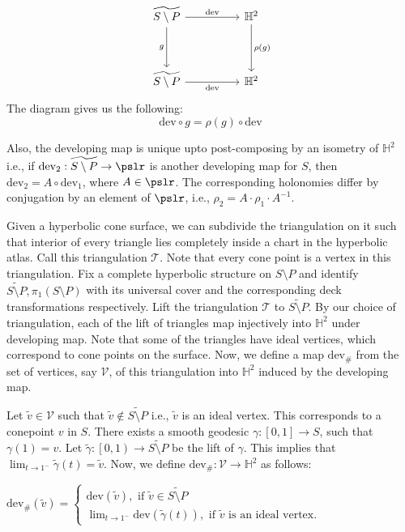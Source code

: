 \[\begin{tikzcd}
	{\widetilde{S \setminus P}} && {\mathbb{H}^2} \\
	\\
	{\widetilde{S \setminus P}} && {\mathbb{H}^2}
	\arrow["{\text{dev}}", from=1-1, to=1-3]
	\arrow["{\rho(g)}", from=1-3, to=3-3]
	\arrow["g"', from=1-1, to=3-1]
	\arrow["{\text{dev}}"', from=3-1, to=3-3]
\end{tikzcd}\]
The diagram gives us the following:
$$ \text{dev} \circ g = \rho(g) \circ \text{dev} $$

Also, the developing map is unique upto post-composing by an isometry of $\mathbb{H}^2$ i.e., if $\text{dev}_2: \widetilde{S\setminus P} \rightarrow \pslr$ is another developing map for $S$, then $\text{dev}_2 = A \circ \text{dev}_1$, where $A \in \pslr$. The corresponding holonomies differ by conjugation by an element of $\pslr$, i.e., $\rho_2 = A \cdot \rho_1 \cdot A^{-1}$. 

Given a hyperbolic cone surface, we can subdivide the triangulation on it such that interior of every triangle lies completely inside a chart in the hyperbolic atlas. Call this triangulation $\mathcal{T}$. Note that every cone point is a vertex in this triangulation. Fix a complete hyperbolic structure on $S \setminus P$ and identify $\widetilde{S \setminus P},  \pi_1(S \setminus P)$ with its universal cover and the corresponding deck transformations respectively. Lift the triangulation $\mathcal{T}$ to $\widetilde{S \setminus P}$. By our choice of triangulation, each of the lift of triangles map injectively into $\mathbb{H}^2$ under developing map. Note that some of the triangles have ideal vertices, which correspond to cone points on the surface. Now, we define a map $\text{dev}_{\#}$ from the set of vertices, say $\mathcal{V}$, of this triangulation into $\mathbb{H}^2$ induced by the developing map.

Let $\tilde{v} \in \mathcal{V}$ such that $\tilde{v} \notin \tilde{S \setminus P}$ i.e., $\tilde{v}$ is an ideal vertex. This corresponds to a conepoint $v$ in $S$. There exists a smooth geodesic $\gamma: [0,1] \rightarrow S$, such that $\gamma(1) = v$. Let $\widetilde{\gamma}: \left[0,1\right) \rightarrow \widetilde{S \setminus P}$ be the lift of $\gamma$. This implies that 
$\displaystyle \lim_{t \rightarrow 1^-} \tilde{\gamma}(t) = \tilde{v}$. Now, we define $\text{dev}_{\#}: \mathcal{V} \rightarrow \mathbb{H}^2$ as follows:
\begin{center}
	$\text{dev}_{\#}(\tilde{v})= 
	\begin{cases}
		\text{dev}(\tilde{v}), \text{ if } \tilde{v} \in \widetilde{S \setminus P} \\
		\displaystyle \lim_{t \rightarrow 1^-} \text{dev}(\tilde{\gamma}(t)), \text{ if } \tilde{v} \text{ is an ideal vertex.}
	\end{cases}$
\end{center}

